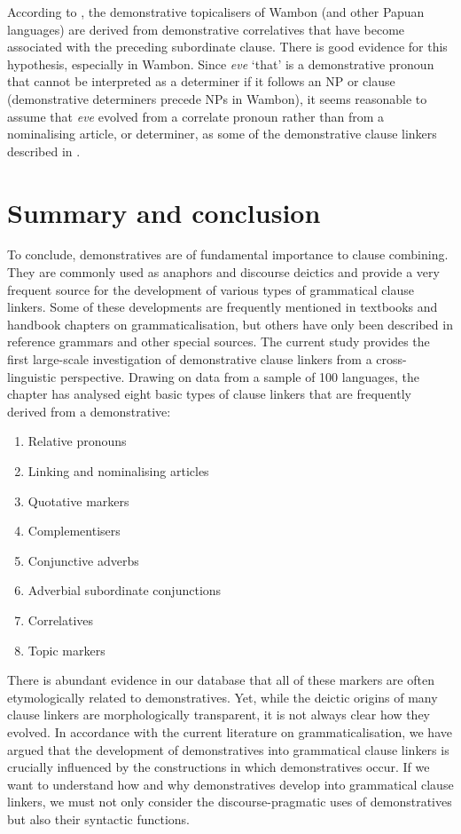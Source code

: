 \documentclass[output=paper,colorlinks,citecolor=brown]{langscibook}
\begin{document}
According to \citeauthor{Vries1995}, the demonstrative topicalisers of Wambon (and other Papuan languages) are derived from demonstrative correlatives that have become associated with the preceding subordinate clause. There is good evidence for this hypothesis, especially in Wambon. Since \textit{eve} ‘that’ is a demonstrative pronoun that cannot be interpreted as a determiner if it follows an NP or clause (demonstrative determiners precede NPs in Wambon), it seems reasonable to assume that \textit{eve} evolved from a correlate pronoun rather than from a nominalising article, or determiner, as some of the demonstrative clause linkers described in  \citep[187-188]{Reesink1984}.

\section{Summary and conclusion}

To conclude, demonstratives are of fundamental importance to clause combining. They are commonly used as anaphors and discourse deictics and provide a very frequent source for the development of various types of grammatical clause linkers. Some of these developments are frequently mentioned in textbooks and handbook chapters on grammaticalisation, but others have only been described in reference grammars and other special sources. The current study provides the first large-scale investigation of demonstrative clause linkers from a cross-linguistic perspective. Drawing on data from a sample of 100 languages, the chapter has analysed eight basic types of clause linkers that are frequently derived from a demonstrative:

\begin{enumerate}
\item
Relative pronouns
\item
Linking and nominalising articles
\item
Quotative markers
\item
Complementisers
\item
Conjunctive adverbs
\item
Adverbial subordinate conjunctions
\item
Correlatives
\item
Topic markers
\end{enumerate}

There is abundant evidence in our database that all of these markers are often etymologically related to demonstratives. Yet, while the deictic origins of many clause linkers are morphologically transparent, it is not always clear how they evolved. In accordance with the current literature on grammaticalisation, we have argued that the development of demonstratives into grammatical clause linkers is crucially influenced by the constructions in which demonstratives occur. If we want to understand how and why demonstratives develop into grammatical clause linkers, we must not only consider the discourse-pragmatic uses of demonstratives but also their syntactic functions.
\end{document}
